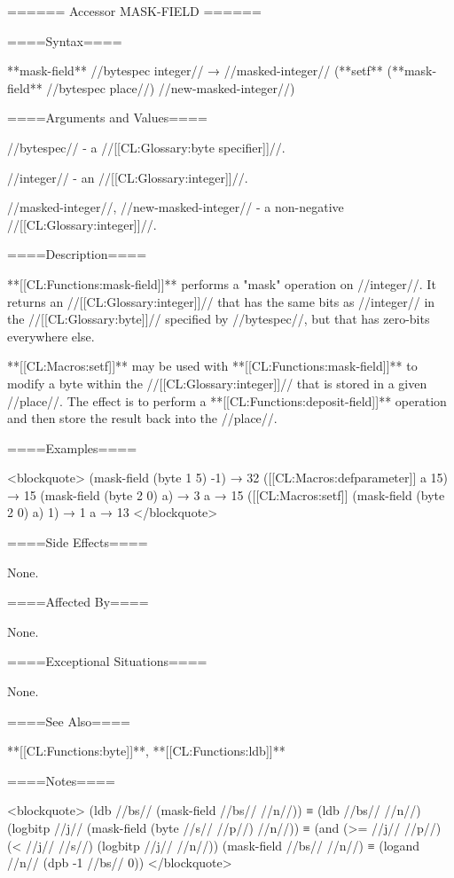 ====== Accessor MASK-FIELD ======

====Syntax====

**mask-field** //bytespec integer// → //masked-integer// (**setf** (**mask-field** //bytespec place//) //new-masked-integer//)

====Arguments and Values====

//bytespec// - a //[[CL:Glossary:byte specifier]]//.

//integer// - an //[[CL:Glossary:integer]]//.

//masked-integer//, //new-masked-integer// - a non-negative //[[CL:Glossary:integer]]//.

====Description====

**[[CL:Functions:mask-field]]** performs a "mask" operation on //integer//. It returns an //[[CL:Glossary:integer]]// that has the same bits as //integer// in the //[[CL:Glossary:byte]]// specified by //bytespec//, but that has zero-bits everywhere else.

**[[CL:Macros:setf]]** may be used with **[[CL:Functions:mask-field]]** to modify a byte within the //[[CL:Glossary:integer]]// that is stored in a given //place//. The effect is to perform a **[[CL:Functions:deposit-field]]** operation and then store the result back into the //place//.

====Examples====

<blockquote> (mask-field (byte 1 5) -1) → 32 ([[CL:Macros:defparameter]] a 15) → 15 (mask-field (byte 2 0) a) → 3 a → 15 ([[CL:Macros:setf]] (mask-field (byte 2 0) a) 1) → 1 a → 13 </blockquote>

====Side Effects====

None.

====Affected By====

None.

====Exceptional Situations====

None.

====See Also====

**[[CL:Functions:byte]]**, **[[CL:Functions:ldb]]**

====Notes====

<blockquote> (ldb //bs// (mask-field //bs// //n//)) ≡ (ldb //bs// //n//) (logbitp //j// (mask-field (byte //s// //p//) //n//)) ≡ (and (>= //j// //p//) (< //j// //s//) (logbitp //j// //n//)) (mask-field //bs// //n//) ≡ (logand //n// (dpb -1 //bs// 0)) </blockquote>

